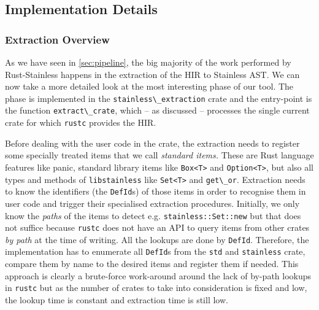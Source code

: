 \begin{quote}
\end{quote}



\subsection{Implementation Details}

\subsubsection{Extraction Overview}
\label{sec:extraction-overview}

As we have seen in \autoref{sec:pipeline}, the big majority of the work
performed by Rust-Stainless happens in the extraction of the HIR to
Stainless AST. We can now take a more detailed look at the most
interesting phase of our tool. The phase is implemented in the
\passthrough{\lstinline!stainless\_extraction!} crate and the
entry-point is the function \passthrough{\lstinline!extract\_crate!},
which -- as discussed -- processes the single current crate for which
\passthrough{\lstinline!rustc!} provides the HIR.

Before dealing with the user code in the crate, the extraction needs to
register some specially treated items that we call \emph{standard
items.} These are Rust language features like panic, standard library
items like \passthrough{\lstinline!Box<T>!} and
\passthrough{\lstinline!Option<T>!}, but also all types and methods of
\passthrough{\lstinline!libstainless!} like
\passthrough{\lstinline!Set<T>!} and \passthrough{\lstinline!get\_or!}.
Extraction needs to know the identifiers (the
\passthrough{\lstinline!DefId!}s) of those items in order to recognise
them in user code and trigger their specialised extraction procedures.
Initially, we only know the \emph{paths} of the items to detect e.g.
\passthrough{\lstinline!stainless::Set::new!} but that does not suffice
because \passthrough{\lstinline!rustc!} does not have an API to query
items from other crates \emph{by path} at the time of writing. All the
lookups are done by \passthrough{\lstinline!DefId!}. Therefore, the
implementation has to enumerate all \passthrough{\lstinline!DefId!}s
from the \passthrough{\lstinline!std!} and
\passthrough{\lstinline!stainless!} crate, compare them by name to the
desired items and register them if needed. This approach is clearly a
brute-force work-around around the lack of by-path lookups in
\passthrough{\lstinline!rustc!} but as the number of crates to take into
consideration is fixed and low, the lookup time is constant and
extraction time is still low.

